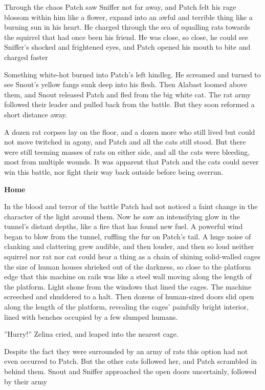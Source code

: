 \documentclass[11pt]{article}
\begin{document}
Through the chaos Patch saw Sniffer not far away, and Patch felt his rage blossom within him like a flower, expand into an awful and terrible thing like a burning sun in his heart. He charged through the sea of squalling rats towards the squirrel that had once been his friend. He was close, so close, he could see Sniffer's shocked and frightened eyes, and Patch opened his mouth to bite and charged faster %
\par
 Something white-hot burned into Patch's left hindleg. He screamed and turned to see Snout's yellow fangs sunk deep into his flesh. Then Alabast loomed above them, and Snout released Patch and fled from the big white cat. The rat army followed their leader and pulled back from the battle. But they soon reformed a short distance away.\par
 A dozen rat corpses lay on the floor, and a dozen more who still lived but could not move twitched in agony, and Patch and all the cats still stood. But there were still teeming masses of rats on either side, and all the cats were bleeding, most from multiple wounds. It was apparent that Patch and the cats could never win this battle, nor fight their way back outside before being overrun.\par
\par
{\bf Home\par
}\par
 In the blood and terror of the battle Patch had not noticed a faint change in the character of the light around them. Now he saw an intensifying glow in the tunnel's distant depths, like a fire that has found new fuel. A powerful wind began to blow from the tunnel, ruffling the fur on Patch's tail. A huge noise of clanking and clattering grew audible, and then louder, and then so loud neither squirrel nor rat nor cat could hear a thing as a chain of shining solid-walled cages the size of human houses shrieked out of the darkness, so close to the platform edge that this machine on rails was like a steel wall moving along the length of the platform. Light shone from the windows that lined the cages. The machine screeched and shuddered to a halt. Then dozens of human-sized doors slid open along the length of the platform, revealing the cages' painfully bright interior, lined with benches occupied by a few slumped humans.\par
 ''Hurry!'' Zelina cried, and leaped into the nearest cage.\par
 Despite the fact they were surrounded by an army of rats this option had not even occurred to Patch. But the other cats followed her, and Patch scrambled in behind them. Snout and Sniffer approached the open doors uncertainly, followed by their army %
\end{document}
